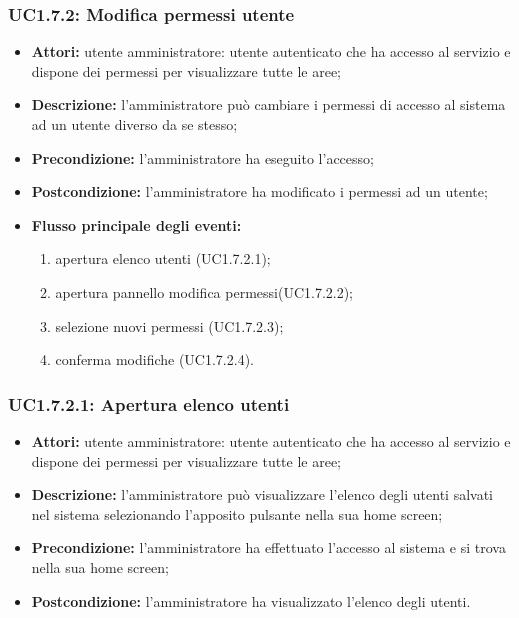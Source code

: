\subsubsection{UC1.7.2: Modifica permessi utente}

\begin{itemize}
    \item \textbf{Attori:} utente amministratore: utente autenticato che ha accesso al servizio e dispone dei permessi per visualizzare tutte le aree;
    \item \textbf{Descrizione:} l'amministratore può cambiare i permessi di accesso al sistema ad un utente diverso da se stesso;
    \item \textbf{Precondizione:} l'amministratore ha eseguito l'accesso;
    \item \textbf{Postcondizione:} l'amministratore ha modificato i permessi ad un utente;
    \item \textbf{Flusso principale degli eventi:}
    \begin{enumerate}
        \item apertura elenco utenti (UC1.7.2.1);
        \item apertura pannello modifica permessi(UC1.7.2.2);
        \item selezione nuovi permessi (UC1.7.2.3);
        \item conferma modifiche (UC1.7.2.4).
    \end{enumerate}
\end{itemize}

\subsubsection{UC1.7.2.1: Apertura elenco utenti}

\begin{itemize}
    \item \textbf{Attori:} utente amministratore: utente autenticato che ha accesso al servizio e dispone dei permessi per visualizzare tutte le aree;
    \item \textbf{Descrizione:} l'amministratore può visualizzare l'elenco degli utenti salvati nel sistema selezionando l'apposito pulsante nella sua home screen;
    \item \textbf{Precondizione:} l'amministratore ha effettuato l'accesso al sistema e si trova nella sua home screen;
    \item \textbf{Postcondizione:} l'amministratore ha visualizzato l'elenco degli utenti.
\end{itemize}

